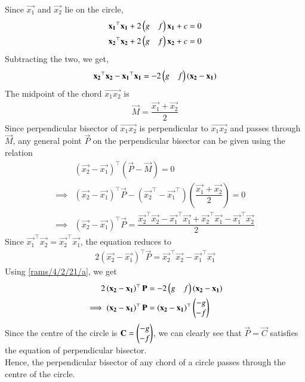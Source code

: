 Since $\vec{x_1}$ and $\vec{x_2}$ lie on the circle,
\begin{align}
       \mathbf{x_1}^\top\mathbf{x_1}+2\begin{pmatrix}g&f\end{pmatrix}\mathbf{x_1}+c=0\\
       \mathbf{x_2}^\top\mathbf{x_2}+2\begin{pmatrix}g&f\end{pmatrix}\mathbf{x_2}+c=0
\end{align}
Subtracting the two, we get,
\begin{align}
    \mathbf{x_2}^\top\mathbf{x_2}-\mathbf{x_1}^\top\mathbf{x_1}=-2\begin{pmatrix}g&f\end{pmatrix}(\mathbf{x_2}-\mathbf{x_1}) \label{rams/4/2/21/a}
\end{align}
The midpoint of the chord $\vec{x_1x_2}$ is 
\begin{align}
    \vec{M}=\dfrac{\vec{x_1}+\vec{x_2}}{2}
\end{align}
Since perpendicular bisector of $\vec{x_1x_2}$ is perpendicular to $\vec{x_1x_2}$ and passes through $\vec{M}$, any general point $\vec{P}$ on the perpendicular bisector can be given using the relation
\begin{align}
    &\left(\vec{x_2}-\vec{x_1}\right)^\top\left(\vec{P}-\vec{M}\right)=0\\
    \implies &\left(\vec{x_2}-\vec{x_1}\right)^\top\vec{P}-\left(\vec{x_2}^\top-\vec{x_1}^\top\right)\left(\dfrac{\vec{x_1}+\vec{x_2}}{2}\right)=0\\
    \implies &\left(\vec{x_2}-\vec{x_1}\right)^\top\vec{P}=\dfrac{\vec{x_2}^\top\vec{x_2}-\vec{x_1}^\top\vec{x_1}+\vec{x_2}^\top\vec{x_1}-\vec{x_1}^\top\vec{x_2}}{2}
\end{align}
Since $\vec{x_1}^\top\vec{x_2}=\vec{x_2}^\top\vec{x_1}$, the equation reduces to
\begin{align}
    2\left(\vec{x_2}-\vec{x_1}\right)^\top\vec{P}=\vec{x_2}^\top\vec{x_2}-\vec{x_1}^\top\vec{x_1}
\end{align}
Using \eqref{rams/4/2/21/a}, we get
\begin{align}
    2\left(\mathbf{x_2}-\mathbf{x_1}\right)^\top\mathbf{P}&=-2\begin{pmatrix}g&f\end{pmatrix}(\mathbf{x_2}-\mathbf{x_1})\\
    \implies \left(\mathbf{x_2}-\mathbf{x_1}\right)^\top\mathbf{P}&=\left(\mathbf{x_2}-\mathbf{x_1}\right)^\top\begin{pmatrix}-g\\-f\end{pmatrix}
\end{align}
Since the centre of the circle is $\mathbf{C}=\begin{pmatrix}-g\\-f\end{pmatrix}$, we can clearly see that $\vec{P}=\vec{C}$ satisfies the equation of perpendicular bisector.\\

Hence, the perpendicular bisector of any chord of a circle passes through the centre of the circle.\\

